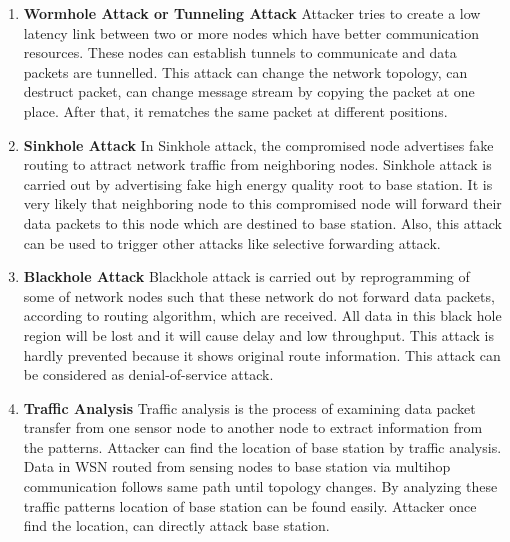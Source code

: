 \begin{enumerate}[label=\textbf{\roman*}]
    \item \textbf{Wormhole Attack or Tunneling Attack} \cite{singh2014survey} Attacker tries to create a low latency link between two or more nodes which have better communication resources. These nodes can establish tunnels to communicate and data packets are tunnelled. This attack can change the network topology, can destruct packet, can change message stream by copying the packet at one place. After that, it rematches the same packet at different positions.
    
    \item \textbf{Sinkhole Attack }\cite{salehi2013detection} In Sinkhole attack, the compromised node advertises fake routing to attract network traffic from neighboring nodes. Sinkhole attack is carried out by advertising fake high energy quality root to base station. It is very likely that neighboring node to this compromised node will forward their data packets to this node which are destined to base station. Also, this attack can be used to trigger other attacks like selective forwarding attack. 

    \item \textbf{Blackhole Attack }\cite{wazid2013detection} Blackhole attack is carried out by reprogramming of some of network nodes such that these network do not forward data packets, according to routing algorithm, which are received. All data in this black hole region will be lost and it will cause delay and low throughput. This attack is hardly prevented because it shows original route information. This attack can be considered as denial-of-service attack.
    
    
    \item \textbf{Traffic Analysis }\cite{deng2005countermeasures} Traffic analysis is the process of examining data packet transfer from one sensor node to another node to extract information from the patterns. Attacker can find the location of base station by traffic analysis. Data in WSN routed from sensing nodes to base station via multihop communication follows same path until topology changes. By analyzing these traffic patterns location of base station can be found easily. Attacker once find the location, can directly attack base station.
    

\end{enumerate}
